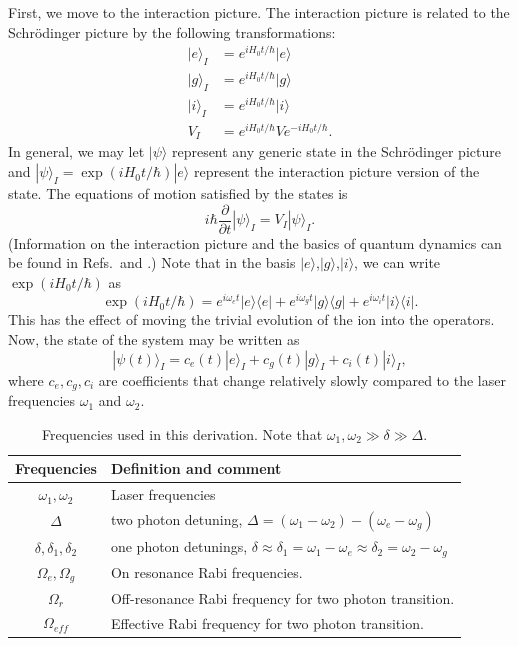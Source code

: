 First, we move to the interaction picture. The interaction picture is related to the Schr\"odinger picture by the following transformations: 
\begin{align}
\label{intTransforms}
|e\rangle_I&=e^{iH_0t/\hbar}|e\rangle\\
|g\rangle_I&=e^{iH_0t/\hbar}|g\rangle\\
|i\rangle_I&=e^{iH_0t/\hbar}|i\rangle\\
V_I&=e^{iH_0t/\hbar}Ve^{-iH_0t/\hbar}.
\end{align}
In general, we may let $|\psi\rangle$ represent any generic state in the Schr\"odinger picture and $|\psi\rangle_I=\exp(iH_0t/\hbar)|e\rangle$ represent the interaction picture version of the state. The equations of motion satisfied by the states is 
\begin{equation}
i\hbar \frac{\partial}{\partial t}|\psi\rangle_I= V_I|\psi\rangle_I.
\end{equation}
(Information on the interaction picture and the basics of quantum dynamics can be found in Refs.\,\cite{sakurai} and \cite{merzbacher}.) Note that in the basis $|e\rangle$,$|g\rangle$,$|i\rangle$, we can write $\exp(iH_0t/\hbar)$ as 
\begin{equation}
\label{expH0}
\exp(iH_0t/\hbar)=e^{i\omega_e t}|e\rangle\langle e|+e^{i\omega_g t}|g\rangle \langle g|+e^{i\omega_i t}|i\rangle\langle i|.
\end{equation}
This has the effect of moving the trivial evolution of the ion into the operators. Now, the state of the system may be written as  
\begin{equation}
|\psi(t)\rangle_I = c_e(t)|e\rangle_I+c_g(t)|g\rangle_I+c_i(t)|i\rangle_I,
\end{equation}
where $c_e,c_g,c_i$ are coefficients that change relatively slowly compared to the laser frequencies $\omega_1$ and $\omega_2$.

\begin{table}[h!]
\centering
\begin{tabular}{|c|l|}
\hline
Frequencies & Definition and comment \\ \hline \hline
$\omega_1,\omega_2$& Laser frequencies\\ \hline
$\Delta$ & two photon detuning, $\Delta=(\omega_1-\omega_2)-(\omega_e-\omega_g)$\\ \hline
$\delta,\delta_1,\delta_2$& one photon detunings, $\delta\approx\delta_1=\omega_1-\omega_e\approx
\delta_2=\omega_2-\omega_g$\\ \hline
$\Omega_{e},\Omega_{g}$ & On resonance Rabi frequencies. \\ \hline
$\Omega_{r}$ & Off-resonance Rabi frequency for two photon transition.\\ \hline
$\Omega_{\mathit{eff}}$ & Effective Rabi frequency for two photon transition.\\ \hline
\end{tabular}
\caption{Frequencies used in this derivation. Note that $\omega_1,\omega_2\gg \delta \gg \Delta$. }
\label{frequencyTable}
\end{table}

